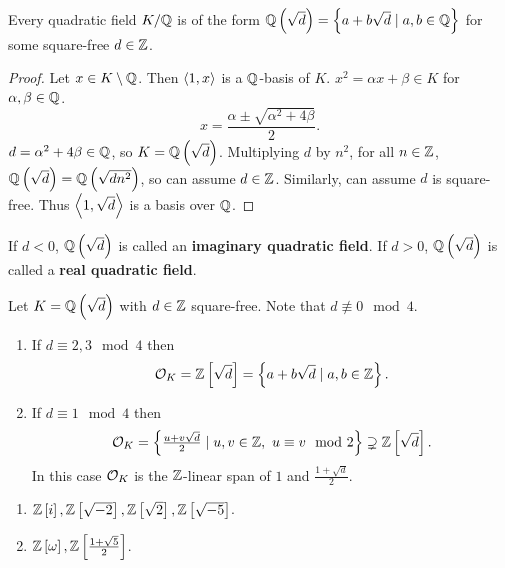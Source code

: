 \begin{lemma}
Every quadratic field $ K / \mathbb{Q} $ is of the form $ \mathbb{Q}\left( \sqrt{d} \right) = \left\{ a + b\sqrt{d} \mid a, b \in \mathbb{Q} \right\} $ for some square-free $ d \in \mathbb{Z} $.
\end{lemma}

\begin{proof}
Let $ x \in K \setminus \mathbb{Q} $. Then $ \left\langle 1, x \right\rangle $ is a $ \mathbb{Q} $-basis of $ K $. $ x^2 = \alpha x + \beta \in K $ for $ \alpha, \beta \in \mathbb{Q} $.
$$ x = \dfrac{\alpha \pm \sqrt{\alpha^2 + 4\beta}}{2}. $$
$ d = \alpha^2 + 4\beta \in \mathbb{Q} $, so $ K = \mathbb{Q}\left( \sqrt{d} \right) $. Multiplying $ d $ by $ n^2 $, for all $ n \in \mathbb{Z} $, $ \mathbb{Q}\left( \sqrt{d} \right) = \mathbb{Q}\left( \sqrt{dn^2} \right) $, so can assume $ d \in \mathbb{Z} $. Similarly, can assume $ d $ is square-free. Thus $ \left\langle 1, \sqrt{d} \right\rangle $ is a basis over $ \mathbb{Q} $.
\end{proof}

\begin{remark*}
If $ d < 0 $, $ \mathbb{Q}\left( \sqrt{d} \right) $ is called an \textbf{imaginary quadratic field}. If $ d > 0 $, $ \mathbb{Q}\left( \sqrt{d} \right) $ is called a \textbf{real quadratic field}.
\end{remark*}

\begin{theorem}
Let $ K = \mathbb{Q}\left( \sqrt{d} \right) $ with $ d \in \mathbb{Z} $ square-free. Note that $ d \not\equiv 0 \mod 4 $.
\begin{enumerate}
\item If $ d \equiv 2, 3 \mod 4 $ then
$$ \mathcal{O}_K = \mathbb{Z}\left[ \sqrt{d} \right] = \left\{ a + b\sqrt{d} \mid a, b \in \mathbb{Z} \right\}. $$
\item If $ d \equiv 1 \mod 4 $ then
$$ \mathcal{O}_K = \left\{ \tfrac{u + v\sqrt{d}}{2} \mid u, v \in \mathbb{Z}, \ u \equiv v \mod 2 \right\} \supsetneq \mathbb{Z}\left[ \sqrt{d} \right]. $$
In this case $ \mathcal{O}_K $ is the $ \mathbb{Z} $-linear span of $ 1 $ and $ \tfrac{1 + \sqrt{d}}{2} $.
\end{enumerate}
\end{theorem}

\begin{example*}
\hfill
\begin{enumerate}
\item $ \mathbb{Z}\left[ i \right], \mathbb{Z}\left[ \sqrt{-2} \right], \mathbb{Z}\left[ \sqrt{2} \right], \mathbb{Z}\left[ \sqrt{-5} \right] $.
\item $ \mathbb{Z}\left[ \omega \right], \mathbb{Z}\left[ \tfrac{1 + \sqrt{5}}{2} \right] $.
\end{enumerate}
\end{example*}

